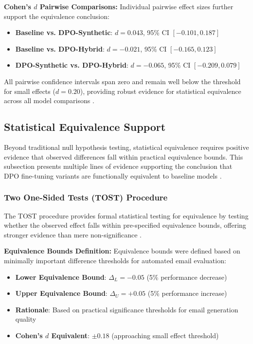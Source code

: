 \textbf{Cohen's $d$ Pairwise Comparisons:}
Individual pairwise effect sizes further support the equivalence conclusion:
\begin{itemize}
    \item \textbf{Baseline vs. DPO-Synthetic}: $d = 0.043$, 95\% CI $[-0.101, 0.187]$
    \item \textbf{Baseline vs. DPO-Hybrid}: $d = -0.021$, 95\% CI $[-0.165, 0.123]$
    \item \textbf{DPO-Synthetic vs. DPO-Hybrid}: $d = -0.065$, 95\% CI $[-0.209, 0.079]$
\end{itemize}

All pairwise confidence intervals span zero and remain well below the threshold for small effects ($d = 0.20$), providing robust evidence for statistical equivalence across all model comparisons \cite{kalavasis2023statistical_indistinguishability}.

\subsection{Statistical Equivalence Support}
\label{subsec:statistical-equivalence-support}

Beyond traditional null hypothesis testing, statistical equivalence requires positive evidence that observed differences fall within practical equivalence bounds. This subsection presents multiple lines of evidence supporting the conclusion that DPO fine-tuning variants are functionally equivalent to baseline models \cite{pozzoli2024stochastic_signal_detection, cai2022heterogeneous_treatment}.

\subsubsection{Two One-Sided Tests (TOST) Procedure}

The TOST procedure provides formal statistical testing for equivalence by testing whether the observed effect falls within pre-specified equivalence bounds, offering stronger evidence than mere non-significance \cite{vandijcke2025metric_space_test}.

\textbf{Equivalence Bounds Definition:}
Equivalence bounds were defined based on minimally important difference thresholds for automated email evaluation:
\begin{itemize}
    \item \textbf{Lower Equivalence Bound}: $\Delta_L = -0.05$ (5\% performance decrease)
    \item \textbf{Upper Equivalence Bound}: $\Delta_U = +0.05$ (5\% performance increase)
    \item \textbf{Rationale}: Based on practical significance thresholds for email generation quality
    \item \textbf{Cohen's $d$ Equivalent}: $\pm 0.18$ (approaching small effect threshold)
\end{itemize}

